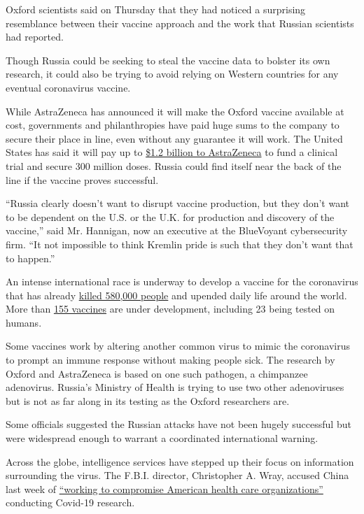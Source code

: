 Oxford scientists said on Thursday that they had noticed a surprising
resemblance between their vaccine approach and the work that Russian
scientists had reported.

Though Russia could be seeking to steal the vaccine data to bolster its
own research, it could also be trying to avoid relying on Western
countries for any eventual coronavirus vaccine.

While AstraZeneca has announced it will make the Oxford vaccine
available at cost, governments and philanthropies have paid huge sums to
the company to secure their place in line, even without any guarantee it
will work. The United States has said it will pay up to
\href{https://www.nytimes.com/2020/05/21/health/coronavirus-vaccine-astrazeneca.html}{\$1.2
billion to AstraZeneca} to fund a clinical trial and secure 300 million
doses. Russia could find itself near the back of the line if the vaccine
proves successful.

``Russia clearly doesn't want to disrupt vaccine production, but they
don't want to be dependent on the U.S. or the U.K. for production and
discovery of the vaccine,'' said Mr. Hannigan, now an executive at the
BlueVoyant cybersecurity firm. ``It not impossible to think Kremlin
pride is such that they don't want that to happen.''

An intense international race is underway to develop a vaccine for the
coronavirus that has already
\href{https://www.nytimes.com/interactive/2020/world/coronavirus-maps.html}{killed
580,000 people} and upended daily life around the world. More than
\href{https://www.nytimes.com/interactive/2020/science/coronavirus-vaccine-tracker.html}{155
vaccines} are under development, including 23 being tested on humans.

Some vaccines work by altering another common virus to mimic the
coronavirus to prompt an immune response without making people sick. The
research by Oxford and AstraZeneca is based on one such pathogen, a
chimpanzee adenovirus. Russia's Ministry of Health is trying to use two
other adenoviruses but is not as far along in its testing as the Oxford
researchers are.

Some officials suggested the Russian attacks have not been hugely
successful but were widespread enough to warrant a coordinated
international warning.

Across the globe, intelligence services have stepped up their focus on
information surrounding the virus. The F.B.I. director, Christopher A.
Wray, accused China last week of
\href{https://www.fbi.gov/news/speeches/the-threat-posed-by-the-chinese-government-and-the-chinese-communist-party-to-the-economic-and-national-security-of-the-united-states}{``working
to compromise American health care organizations''} conducting Covid-19
research.

